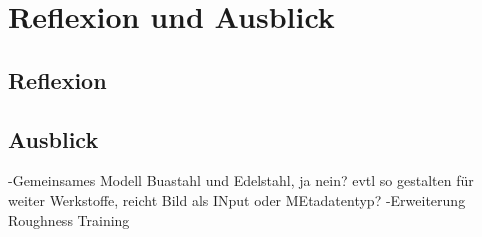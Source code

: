 \chapter{Reflexion und Ausblick}

\section{Reflexion}

\section{Ausblick}
-Gemeinsames Modell Buastahl und Edelstahl, ja nein? evtl so gestalten für weiter Werkstoffe, reicht Bild als INput oder MEtadatentyp?
-Erweiterung Roughness Training